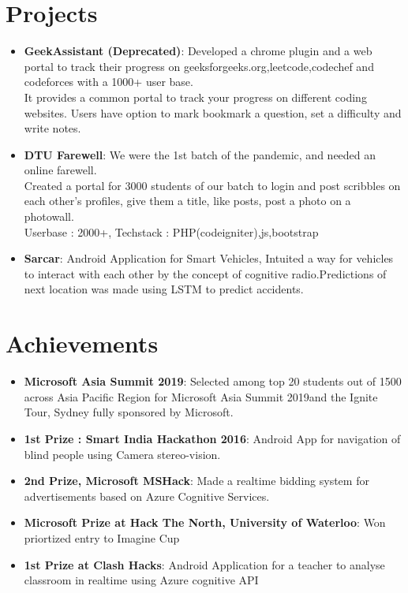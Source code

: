 \documentclass[letterpaper,11pt]{article}
\newcommand{\resumeItem}[2]{
  \item\small{
    \textbf{#1}{: #2 \vspace{-2pt}}
  }
}
\newcommand{\resumeSubItem}[2]{\resumeItem{#1}{#2}\vspace{-6pt}}
\newcommand{\resumeSubHeadingListStart}{\begin{itemize}[leftmargin=*]}
\newcommand{\resumeSubHeadingListEnd}{\end{itemize}}
\begin{document}
\section{Projects}
  \resumeSubHeadingListStart
    \resumeSubItem{GeekAssistant (Deprecated)}
      {Developed a chrome plugin and a web portal to track their progress on geeksforgeeks.org,leetcode,codechef and codeforces with a 1000+ user base.}
      \\[0.8em]\textbullet
      {It provides a common portal to track your progress on different coding websites. Users have option to mark bookmark a question, set a difficulty and write notes.}
    \resumeSubItem{DTU Farewell}
      {We were the 1st batch of the pandemic, and needed an online farewell.}
      \\[0.8em]\textbullet
      { Created a portal for 3000 students of our batch to login and post scribbles on each other's profiles, give them a title, like posts, post a photo on a photowall.}
      \\[0em]\textbullet
      { Userbase : 2000+, Techstack : PHP(codeigniter),js,bootstrap}
    \resumeSubItem{Sarcar}
      {Android Application for Smart Vehicles, Intuited a way for vehicles to interact with each other by the concept of cognitive radio.Predictions of next location was made using LSTM to predict accidents.}
      \\[0.8em]
  \resumeSubHeadingListEnd

\section{Achievements}
    \resumeSubHeadingListStart
    \resumeSubItem
    {Microsoft Asia Summit 2019}
    {Selected among top 20 students out of 1500 across Asia Pacific Region for Microsoft Asia Summit 2019and the Ignite Tour, Sydney fully sponsored by Microsoft.}
    \resumeSubItem
    {1st Prize : Smart India Hackathon 2016}
    {Android App for navigation of blind people using Camera stereo-vision.}
    \resumeSubItem
    {2nd Prize, Microsoft MSHack}
    { Made a realtime bidding system for advertisements based on Azure Cognitive Services.}
    \resumeSubItem
    {Microsoft Prize at Hack The North, University of Waterloo}
    {Won priortized entry to Imagine Cup}
    \resumeSubItem
    {1st Prize at Clash Hacks}
    {Android Application for a teacher to analyse classroom in realtime using Azure cognitive API}
    \resumeSubHeadingListEnd
\end{document}
